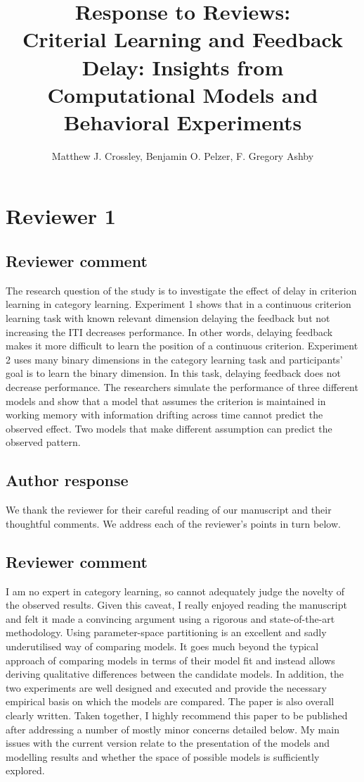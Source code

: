 \documentclass[12pt]{article}
\title{Response to Reviews: \\ \vspace{1cm}
    Criterial Learning and Feedback Delay: Insights from
Computational Models and Behavioral Experiments}
\author{
    Matthew J. Crossley, 
    Benjamin O. Pelzer,
    F. Gregory Ashby
}
\date{}
\begin{document}
\maketitle 

\section{Reviewer 1}

\subsection{Reviewer comment}
The research question of the study is to investigate the
effect of delay in criterion learning in category learning.
Experiment 1 shows that in a continuous criterion learning
task with known relevant dimension delaying the feedback but
not increasing the ITI decreases performance. In other
words, delaying feedback makes it more difficult to learn
the position of a continuous criterion. Experiment 2 uses
many binary dimensions in the category learning task and
participants' goal is to learn the binary dimension. In this
task, delaying feedback does not decrease performance. The
researchers simulate the performance of three different
models and show that a model that assumes the criterion is
maintained in working memory with information drifting
across time cannot predict the observed effect. Two models
that make different assumption can predict the observed
pattern.

\subsection{Author response}
We thank the reviewer for their careful reading of our
manuscript and their thoughtful comments. We address each of
the reviewer's points in turn below.

\subsection{Reviewer comment}
I am no expert in category learning, so cannot adequately
judge the novelty of the observed results. Given this
caveat, I really enjoyed reading the manuscript and felt it
made a convincing argument using a rigorous and
state-of-the-art methodology. Using parameter-space
partitioning is an excellent and sadly underutilised way of
comparing models. It goes much beyond the typical approach
of comparing models in terms of their model fit and instead
allows deriving qualitative differences between the
candidate models. In addition, the two experiments are well
designed and executed and provide the necessary empirical
basis on which the models are compared. The paper is also
overall clearly written. Taken together, I highly recommend
this paper to be published after addressing a number of
mostly minor concerns detailed below. My main issues with
the current version relate to the presentation of the models
and modelling results and whether the space of possible
models is sufficiently explored.
\end{document}
